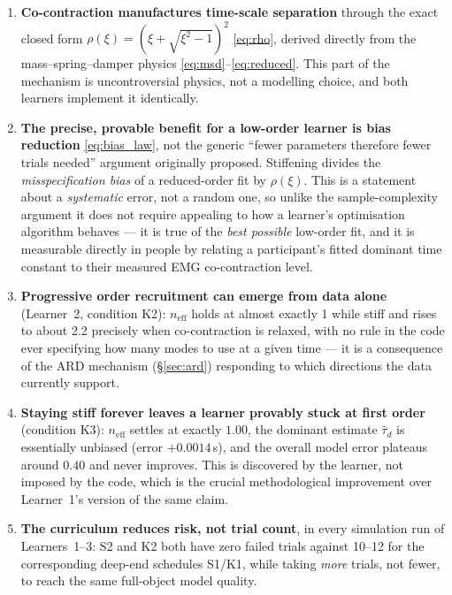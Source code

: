 \documentclass[11pt,a4paper]{article}
\newcommand{\neff}{n_{\mathrm{eff}}}
\begin{document}
\begin{enumerate}
\item \textbf{Co-contraction manufactures time-scale separation} through the
  exact closed form $\rho(\xi)=(\xi+\sqrt{\xi^2-1})^2$ \eqref{eq:rho}, derived
  directly from the mass--spring--damper physics \eqref{eq:msd}--\eqref{eq:reduced}.
  This part of the mechanism is uncontroversial physics, not a modelling
  choice, and both learners implement it identically.

\item \textbf{The precise, provable benefit for a low-order learner is bias
  reduction} \eqref{eq:bias_law}, not the generic ``fewer parameters therefore
  fewer trials needed'' argument originally proposed. Stiffening divides the
  \emph{misspecification bias} of a reduced-order fit by $\rho(\xi)$. This is
  a statement about a \emph{systematic} error, not a random one, so unlike
  the sample-complexity argument it does not require appealing to how a
  learner's optimisation algorithm behaves --- it is true of the
  \emph{best possible} low-order fit, and it is measurable directly in
  people by relating a participant's fitted dominant time constant to their
  measured EMG co-contraction level.

\item \textbf{Progressive order recruitment can emerge from data alone}
  (Learner~2, condition K2): $\neff$ holds at almost exactly 1 while stiff and
  rises to about 2.2 precisely when co-contraction is relaxed, with no rule
  in the code ever specifying how many modes to use at a given time --- it is
  a consequence of the ARD mechanism (\S\ref{sec:ard}) responding to which
  directions the data currently support.

\item \textbf{Staying stiff forever leaves a learner provably stuck at first
  order} (condition K3): $\neff$ settles at exactly $1.00$, the dominant
  estimate $\hat\tau_d$ is essentially unbiased (error $+0.0014$\,s), and the
  overall model error plateaus around $0.40$ and never improves. This is
  discovered by the learner, not imposed by the code, which is the crucial
  methodological improvement over Learner~1's version of the same claim.

\item \textbf{The curriculum reduces risk, not trial count}, in every
  simulation run of Learners~1--3: S2 and K2 both have zero failed trials
  against 10--12 for the corresponding deep-end schedules S1/K1, while taking
  \emph{more} trials, not fewer, to reach the same full-object model quality.


\end{enumerate}
\end{document}
